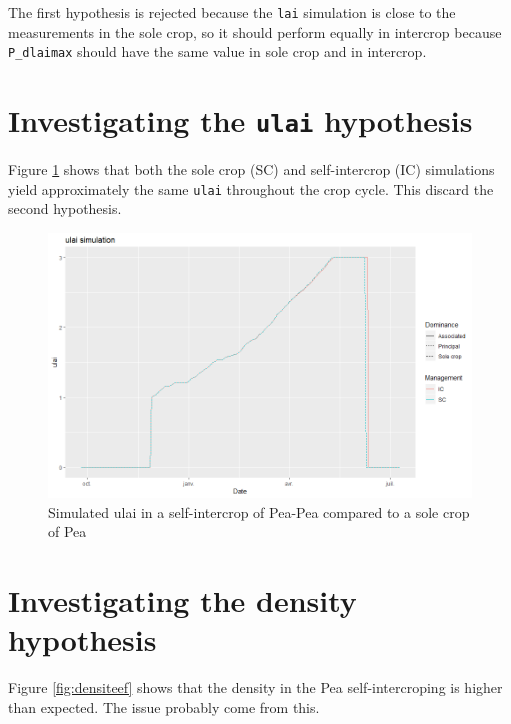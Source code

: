 \documentclass[
]{book}
\begin{document}
The first hypothesis is rejected because the \texttt{lai} simulation is close to the measurements in the sole crop, so it should perform equally in intercrop because \texttt{P\_dlaimax} should have the same value in sole crop and in intercrop.

\hypertarget{investigating-the-ulai-hypothesis}{%
\section{\texorpdfstring{Investigating the \texttt{ulai} hypothesis}{Investigating the ulai hypothesis}}\label{investigating-the-ulai-hypothesis}}

Figure \ref{fig:ulai} shows that both the sole crop (SC) and self-intercrop (IC) simulations yield approximately the same \texttt{ulai} throughout the crop cycle. This discard the second hypothesis.

\begin{figure}
\centering
\includegraphics{img/ulai_laitoohigh.png}
\caption{\label{fig:ulai}Simulated ulai in a self-intercrop of Pea-Pea compared to a sole crop of Pea}
\end{figure}

\hypertarget{investigating-the-density-hypothesis}{%
\section{Investigating the density hypothesis}\label{investigating-the-density-hypothesis}}

Figure \ref{fig:densiteef} shows that the density in the Pea self-intercroping is higher than expected. The issue probably come from this.
\end{document}
